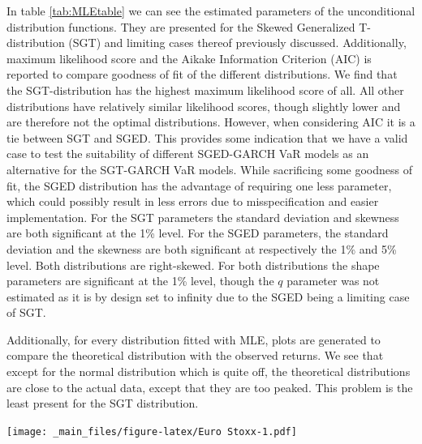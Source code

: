 \documentclass[a4paper, twoside]{templates/ociamthesis}
\begin{document}
In table \ref{tab:MLEtable} we can see the estimated parameters of the unconditional distribution functions. They are presented for the Skewed Generalized T-distribution (SGT) and limiting cases thereof previously discussed. Additionally, maximum likelihood score and the Aikake Information Criterion (AIC) is reported to compare goodness of fit of the different distributions. We find that the SGT-distribution has the highest maximum likelihood score of all. All other distributions have relatively similar likelihood scores, though slightly lower and are therefore not the optimal distributions. However, when considering AIC it is a tie between SGT and SGED. This provides some indication that we have a valid case to test the suitability of different SGED-GARCH VaR models as an alternative for the SGT-GARCH VaR models. While sacrificing some goodness of fit, the SGED distribution has the advantage of requiring one less parameter, which could possibly result in less errors due to misspecification and easier implementation. For the SGT parameters the standard deviation and skewness are both significant at the 1\% level. For the SGED parameters, the standard deviation and the skewness are both significant at respectively the 1\% and 5\% level. Both distributions are right-skewed. For both distributions the shape parameters are significant at the 1\% level, though the \(q\) parameter was not estimated as it is by design set to infinity due to the SGED being a limiting case of SGT.

Additionally, for every distribution fitted with MLE, plots are generated to compare the theoretical distribution with the observed returns. We see that except for the normal distribution which is quite off, the theoretical distributions are close to the actual data, except that they are too peaked. This problem is the least present for the SGT distribution.

\texttt{[image: \_main\_files/figure-latex/Euro Stoxx-1.pdf]}
\end{document}
